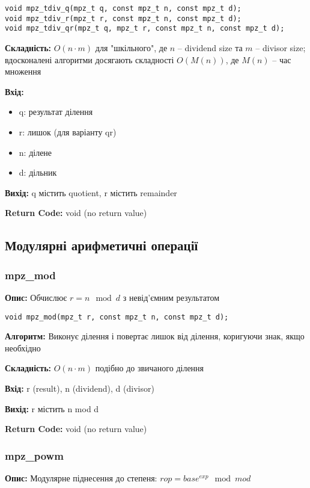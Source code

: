 \begin{verbatim}
void mpz_tdiv_q(mpz_t q, const mpz_t n, const mpz_t d);
void mpz_tdiv_r(mpz_t r, const mpz_t n, const mpz_t d);
void mpz_tdiv_qr(mpz_t q, mpz_t r, const mpz_t n, const mpz_t d);
\end{verbatim}

\textbf{Складність:} $O(n \cdot m)$ для "шкільного"{}, де $n$ -- dividend size та $m$ -- divisor size; 
вдосконалені алгоритми досягають складності $O(M(n))$, де $M(n)$ -- час множення

\textbf{Вхід:}
\begin{itemize}
    \item q: результат ділення
    \item r: лишок (для варіанту qr)
    \item n: ділене
    \item d: дільник
\end{itemize}

\textbf{Вихід:} q містить quotient, r містить remainder

\textbf{Return Code:} void (no return value)

\subsection{Модулярні арифметичні операції}

\subsubsection{mpz\_mod}
\textbf{Опис:} Обчислює $r = n \mod d$ з невід'ємним результатом

\begin{verbatim}
void mpz_mod(mpz_t r, const mpz_t n, const mpz_t d);
\end{verbatim}

\textbf{Алгоритм:} Виконує ділення і повертає лишок від ділення, коригуючи знак, якщо необхідно

\textbf{Складність:} $O(n \cdot m)$ подібно до звичаного ділення

\textbf{Вхід:} r (result), n (dividend), d (divisor)

\textbf{Вихід:} r містить n mod d

\textbf{Return Code:} void (no return value)

\subsubsection{mpz\_powm}
\textbf{Опис:} Модулярне піднесення до степеня: $rop = base^{exp} \mod mod$

